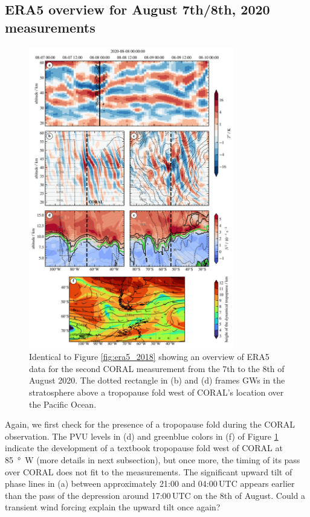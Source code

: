 \subsection*{ERA5 overview for August 7th/8th, 2020 measurements}
\begin{figure}[tbp]
    \centering
    \includegraphics[width=0.8\textwidth]{figures_lidar/era5_trop_strat_24.png}
    \caption{Identical to Figure \ref{fig:era5_2018} showing an overview of ERA5 data for the second CORAL measurement from the 7th to the 8th of August 2020. The dotted rectangle in (b) and (d) frames GWs in the stratosphere above a tropopause fold west of CORAL's location over the Pacific Ocean.}
    \label{fig:era5_2020}
\end{figure}
Again, we first check for the presence of a tropopause fold during the CORAL observation. The PVU levels in (d) and greenblue colors in (f) of Figure \ref{fig:era5_2020} indicate the development of a textbook tropopause fold west of CORAL at \SI{85}{\degree W} (more details in next subsection), but once more, the timing of its pass over CORAL does not fit to the measurements. The significant upward tilt of phase lines in (a) between approximately 21:00 and 04:00$ \, \textrm{UTC}$ appears earlier than the pass of the depression around 17:00$ \, \textrm{UTC}$ on the 8th of August. Could a transient wind forcing explain the upward tilt once again?

